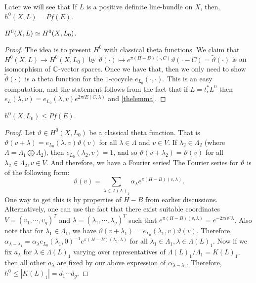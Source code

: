 Later we will see that 
If $L$ is a positive definite line-bundle on $X$, then, $h^0(X,L)=Pf(E)$.


\begin{lemma}
$H^0(X,L)\simeq H^0(X,L_0)$.
\end{lemma}

\begin{proof}
The idea is to present $H^0$ with classical theta functions. We claim that $H^0(X,L)\to H^0(X,L_0)$ by $\vartheta(\cdot)\mapsto e^{\pi(H-B)(\cdot,C)}\vartheta(\cdot-C)=\tilde{\vartheta}(\cdot)$ is an isomorphism of ${\mathbb C}$-vector spaces. Once we have that, then we only need to show $\tilde{\vartheta}(\cdot)$ is a theta function for the $1$-cocycle $e_{L_0}(\cdot,\cdot)$. This is an easy computation, and the statement follows from the fact that if $L=t_\epsilon^* L^0$ then $e_L(\lambda,v)=e_{L_0}(\lambda,v)e^{2\pi i E(C,\lambda)}$ and \ref{thelemma}.
\end{proof}

\begin{lemma}
$h^0(X,L_0)\leq Pf(E)$.
\end{lemma}

\begin{proof}
Let $\vartheta\in H^0(X,L_0)$ be a classical theta function. That is $\vartheta(v+\lambda)=e_{L_0}(\lambda,v)\vartheta(v)$ for all $\lambda\in \Lambda$ and $v\in V$. If $\lambda_2\in \Lambda_2$ (where $\Lambda=\Lambda_1\bigoplus \Lambda_2$), then $e_{L_0}(\lambda_2,v)=1$, and so $\vartheta(v+\lambda_2)=\vartheta(v)$ for all $\lambda_2\in \Lambda_2, v\in V$. And therefore, we have a Fourier series! The Fourier series for $\vartheta$ is of the following form: 
$$\vartheta(v)=\sum_{\lambda\in \Lambda(L)_1}\alpha_\lambda e^{\pi (H-B)(v,\lambda)}.$$
One way to get this is by properties of $H-B$ from earlier discussions. Alternatively, one can use the fact that there exist suitable coordinates $V=(v_1,\cdots, v_g)^T$ and $\lambda=(\lambda_1,\cdots,\lambda_g)^T$ such that $e^{\pi(H-B)(v,\lambda)}=e^{-2\pi i v^T\lambda}$. 
Also note that for $\lambda_1\in \Lambda_1$, we have $\vartheta(v+\lambda_1)=e_{L_0}(\lambda_1,v)\vartheta(v)$. Therefore, 
$\alpha_{\lambda-\lambda_1}=\alpha_\lambda e_{L_0}(\lambda_1,0)^{-1}e^{\pi(H-B)(\lambda_1,\lambda)}$ for all $\lambda_1\in \Lambda_1,\lambda\in \Lambda(L)_1$. 
Now if we fix $a_\lambda$ for $\lambda\in \Lambda(L)_1$ varying over representatives of $\Lambda(L)_1/\Lambda_1=K(L)_1$, then all other $a_\lambda$ are fixed by our above expression of $\alpha_{\lambda-\lambda_1}$. Therefore, $h^0\leq |K(L)_1|=d_1\cdots d_g$. 
\end{proof}

